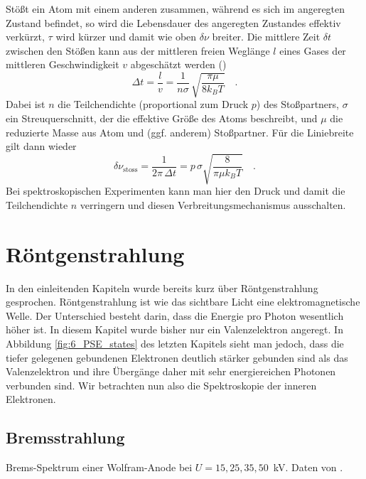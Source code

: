 Stößt ein Atom mit einem anderen zusammen, während es sich im angeregten Zustand befindet, so wird die Lebensdauer des angeregten Zustandes effektiv verkürzt, $\tau$ wird kürzer und damit wie oben $\delta \nu$ breiter. Die mittlere Zeit $\delta t$ zwischen den Stößen kann aus der mittleren freien Weglänge $l$ eines Gases der mittleren Geschwindigkeit $v$ abgeschätzt werden (\cite{Demtroeder_laser}) %
\begin{equation}
    \Delta t = \frac{l}{v} = \frac{1}{n \sigma} \, \sqrt{ \frac{\pi \mu}{8 k_B T}} \quad .
\end{equation}
Dabei ist $n$ die Teilchendichte (proportional zum Druck $p$) des Stoßpartners, $\sigma$ ein Streuquerschnitt, der die effektive Größe des Atoms beschreibt, und $\mu$ die reduzierte  Masse aus Atom und (ggf. anderem) Stoßpartner. Für die Liniebreite gilt dann wieder
\begin{equation}
    \delta \nu_\text{stoss} = \frac{1}{2\pi \, \Delta t} = p \, \sigma \sqrt{ \frac{8}{\pi \mu k_B T}} \quad .
\end{equation}
Bei spektroskopischen Experimenten kann man hier den Druck und damit die Teilchendichte $n$ verringern und diesen Verbreitungsmechanismus ausschalten. 



\section{Röntgenstrahlung}

In den einleitenden Kapiteln wurde bereits kurz über Röntgenstrahlung gesprochen. Röntgenstrahlung ist wie das sichtbare Licht eine elektromagnetische Welle. Der Unterschied besteht darin, dass die Energie pro Photon wesentlich höher ist. In diesem Kapitel wurde bisher nur ein Valenzelektron angeregt. In Abbildung \ref{fig:6_PSE_states} des letzten Kapitels sieht man jedoch, dass die tiefer gelegenen gebundenen Elektronen deutlich stärker gebunden sind als das Valenzelektron und ihre Übergänge daher mit sehr energiereichen Photonen verbunden sind. Wir betrachten nun also die Spektroskopie der inneren Elektronen.

\subsection{Bremsstrahlung}


\begin{marginfigure}
    \caption{Brems-Spektrum einer Wolfram-Anode bei $U= 15, 25, 35, 50$~kV. Daten von \cite{Gilfrich68}.}
    \label{fig:7_bremsstrahlung}
\end{marginfigure}

